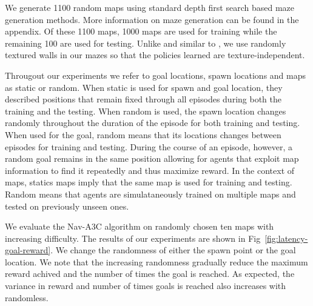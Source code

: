 We generate 1100 random maps using standard depth first search based maze generation methods. More information on maze generation can be found in the appendix. 
Of these 1100 maps, 1000 maps are used for training while the remaining 100 are used for testing.
Unlike \cite{MiPaViICLR2017} and similar to \cite{ChLaSaNIPS2016}, we use randomly textured walls in our mazes so that the policies learned are texture-independent.

Througout our experiments we refer to goal locations, spawn locations and maps as static or random.
When static is used for spawn and goal location, they described positions that remain fixed through all episodes during both the training and the testing.
When random is used, the spawn location changes randomly throughout the duration of the episode for both training and testing. When used for the goal, random means that its locations changes between episodes for training and testing. During the course of an episode, however, a random goal remains in the same position allowing for agents that exploit map information to find it repeatedly and thus maximize reward.
In the context of maps, statics maps imply that the same map is used for training and testing. Random means that agents are simulataneously trained on multiple maps and tested on previously unseen ones.





We evaluate the Nav-A3C\cite{MiPaViICLR2017} algorithm on randomly chosen ten maps with increasing difficulty.
The results of our experiments are shown in Fig~\ref{fig:latency-goal-reward}.
We change the randomness of either the spawn point or the goal location.
We note that the increasing randomness gradually reduce the maximum reward achived and the number of times the goal is reached. As expected, the variance in reward and number of times goals is reached also increases with randomless.

